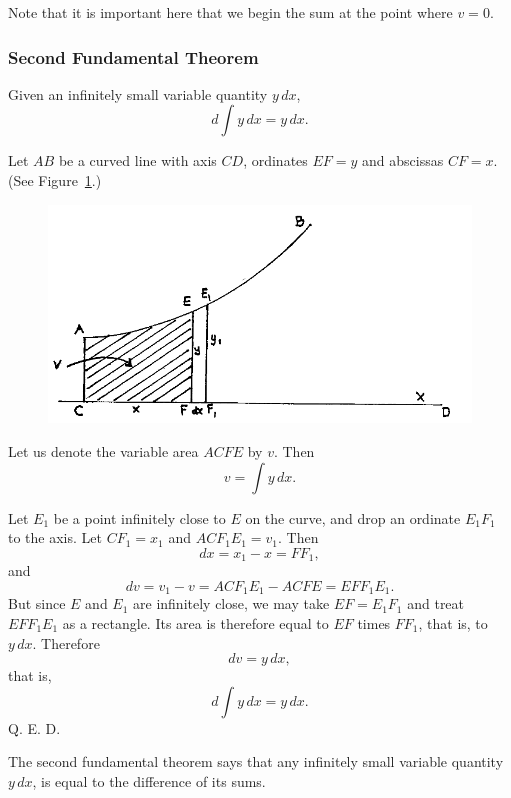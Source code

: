 \documentclass[polutonikogreek,english,twoside,openright]{article}
\begin{document}
Note that it is important here that we begin the sum at the point where $v=0$.


\subsubsection*{Second Fundamental Theorem}
\label{fund2}  Given an infinitely small variable quantity $y\,dx$,
$$d\int\!y\,dx = y\,dx.$$

Let $AB$ be a curved line with axis $CD$, ordinates $EF=y$ and
abscissas $CF = x$.  (See Figure~\ref{sfundfig}.)
\begin{figure}[htp]
  \begin{center}
    \includegraphics[width=\textwidth]{fig/Figure38}
    \caption{}
    \label{sfundfig}
    \vspace{-10pt}
  \end{center}
\end{figure}

Let us denote the variable area $ACFE$ by $v$.  Then 
$$v = \int\!y\,dx.$$

Let $E_1$ be a point infinitely close to $E$ on the curve, and drop an
ordinate $E_1F_1$ to the axis.  Let $CF_1 = x_1$ and $ACF_1E_1 = v_1$.
Then
$$dx = x_1 - x = FF_1,$$
and
$$dv = v_1 - v = ACF_1E_1 - ACFE = EFF_1E_1.$$
But since $E$ and $E_1$ are infinitely close, we may take
$EF = E_1F_1$ and treat $EFF_1E_1$ as a rectangle.  Its area is
therefore equal to $EF$ times $FF_1$, that is, to $y\,dx$.  Therefore
$$dv = y\,dx,$$
that is,
$$d\int\!y\,dx = y\,dx.$$
Q. E. D.

The second fundamental theorem says that any infinitely small variable
quantity $y\,dx$, is equal to the difference of its sums.
\end{document}
